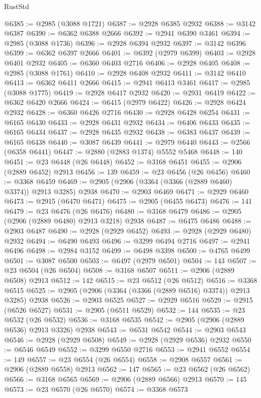 \begin{lexlean}{RustStd}
\begin{coremodule}
{\begin{coremodule}
{{{{{{{{{{{{{{{{{{{{{{{{{{{{{{{{{{{{{{{{{{{{{{{{{{{{{{{{{{{{{{{{{{{{{{{{{{{{{{@6385 := @2985 (@3088 @1721)
@6387 := @2928 @6385 @2932
@6388 := @3142 @6387
@6390 := @6362 @6388 @2666
@6392 := @2941 @6390 @3461
@6394 := @2985 (@3088 @1736)
@6396 := @2928 @6394 @2932
@6397 := @3142 @6396
@6399 := @6362 @6397 @2666
@6401 := @6392 (@2979 @6399)
@6403 := @2928 @6401 @2932
@6405 := @6360 @6403 @2716
@6406 := @2928 @6405
@6408 := @2985 (@3088 @1761)
@6410 := @2928 @6408 @2932
@6411 := @3142 @6410
@6413 := @6362 @6411 @2666
@6415 := @2941 @6413 @3461
@6417 := @2985 (@3088 @1775)
@6419 := @2928 @6417 @2932
@6420 := @2931 @6419
@6422 := @6362 @6420 @2666
@6424 := @6415 (@2979 @6422)
@6426 := @2928 @6424 @2932
@6428 := @6360 @6426 @2716
@6430 := @2928 @6428 @6254
@6431 := @6165 @6430
@6433 := @2928 @6431 @2932
@6434 := @6406 @6433
@6435 := @6165 @6434
@6437 := @2928 @6435 @2932
@6438 := @6383 @6437
@6439 := @6165 @6438
@6440 := @3087 @6439
@6441 := @2979 @6440
@6443 := @2566 (@6358 @6441)
@6447 := @2880 (@2883 @1374) @5552 @5468
@6448 := 140
@6451 := @23 @6448 (@26 @6448)
@6452 := @3168 @6451
@6455 := @2906 (@2889 @6452) @2913
@6456 := 139
@6459 := @23 @6456 (@26 @6456)
@6460 := @3368 @6459
@6469 := @2905 (@2906 (@3364 (@3366 (@2889 @6460) @3374)) @2913 @3285) @2938
@6470 := @2903 @6469
@6471 := @2929 @6460
@6473 := @2915 (@6470 @6471)
@6475 := @2905 (@6455 @6473)
@6476 := 141
@6479 := @23 @6476 (@26 @6476)
@6480 := @3168 @6479
@6486 := @2905 (@2906 (@2889 @6480) @2913 @3218) @2938
@6487 := @6475 @6486
@6488 := @2903 @6487
@6490 := @2928 (@2929 @6452)
@6493 := @2928 (@2929 @6480) @2932
@6494 := @6490 @6493
@6496 := @3299 @6494 @2716
@6497 := @2941 @6496
@6498 := @2984 @3152
@6499 := @6498 @3398
@6500 := @4765 @6499
@6501 := @3087 @6500
@6503 := @6497 (@2979 @6501)
@6504 := 143
@6507 := @23 @6504 (@26 @6504)
@6508 := @3168 @6507
@6511 := @2906 (@2889 @6508) @2913
@6512 := 142
@6515 := @23 @6512 (@26 @6512)
@6516 := @3368 @6515
@6525 := @2905 (@2906 (@3364 (@3366 (@2889 @6516) @3374)) @2913 @3285) @2938
@6526 := @2903 @6525
@6527 := @2929 @6516
@6529 := @2915 (@6526 @6527)
@6531 := @2905 (@6511 @6529)
@6532 := 144
@6535 := @23 @6532 (@26 @6532)
@6536 := @3168 @6535
@6542 := @2905 (@2906 (@2889 @6536) @2913 @3326) @2938
@6543 := @6531 @6542
@6544 := @2903 @6543
@6546 := @2928 (@2929 @6508)
@6549 := @2928 (@2929 @6536) @2932
@6550 := @6546 @6549
@6552 := @3299 @6550 @2716
@6553 := @2941 @6552
@6554 := 149
@6557 := @23 @6554 (@26 @6554)
@6558 := @2908 @6557
@6561 := @2906 (@2889 @6558) @2913
@6562 := 147
@6565 := @23 @6562 (@26 @6562)
@6566 := @3168 @6565
@6569 := @2906 (@2889 @6566) @2913
@6570 := 145
@6573 := @23 @6570 (@26 @6570)
@6574 := @3368 @6573
}}}}}}}}}}}}}}}}}}}}}}}}}}}}}}}}}}}}}}}}}}}}}}}}}}}}}}}}}}}}}}}}}}}}}}}}}}}}}}
\end{coremodule}}
\end{coremodule}
\end{lexlean}
